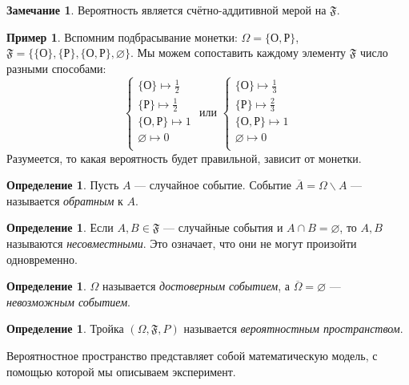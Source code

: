 \documentclass[11pt,openany,a4paper]{scrartcl}
\theoremstyle{plain}
\theoremstyle{definition}
\newtheorem{definition}[theorem]{Определение}
\newtheorem{remark}[theorem]{Замечание}
\newtheorem{example}[theorem]{Пример}
\newcommand{\ol}{\overline}
\begin{document}
\begin{remark}
    Вероятность является счётно-аддитивной мерой на $\mathfrak F$.
\end{remark}

\begin{example}
    Вспомним подбрасывание монетки: $\Omega = \{О, Р\}$,
    $\mathfrak F = \{\{О\}, \{Р\}, \{О, Р\}, \varnothing\}$. Мы можем сопоставить каждому элементу
    $\mathfrak F$ число разными способами:
    $$
    \begin{cases}
        \{О\} \mapsto \frac{1}{2} \\
        \{Р\} \mapsto \frac{1}{2} \\
        \{О, Р\} \mapsto 1        \\
        \varnothing \mapsto 0     \\
    \end{cases}
    \text{ или }
    \begin{cases}
        \{О\} \mapsto \frac{1}{3} \\
        \{Р\} \mapsto \frac{2}{3} \\
        \{О, Р\} \mapsto 1        \\
        \varnothing \mapsto 0     \\
    \end{cases}
    $$
    Разумеется, то какая вероятность будет правильной, зависит от монетки.
\end{example}

\begin{definition}
    Пусть $A$ — случайное событие. Событие $\ol A = \Omega \backslash A$ — называется
    \emph{обратным} к $A$.
\end{definition}
\begin{definition}
    Если $A, B \in \mathfrak F$ — случайные события и $A \cap B = \varnothing$, то $A, B$
    называются \emph{несовместными}. Это означает, что они не могут произойти одновременно.
\end{definition}
\begin{definition}
    $\Omega$ называется \emph{достоверным событием}, а
    $\ol \Omega = \varnothing$ — \emph{невозможным событием}.
\end{definition}

\begin{definition}
    Тройка $(\Omega, \mathfrak F, P)$ называется \emph{вероятностным пространством}.
\end{definition}

Вероятностное пространство представляет собой математическую модель, с помощью которой мы
описываем эксперимент.
\end{document}
